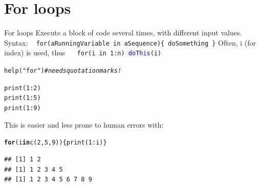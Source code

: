 \documentclass[xcolor=table,      handout ,    xcolor=dvipsnames]{beamer}\usepackage[]{graphicx}\usepackage[]{color}
\makeatletter
\newcommand{\hlnum}[1]{\textcolor[rgb]{0,0,0}{#1}}
\newcommand{\hlstr}[1]{\textcolor[rgb]{0.545,0.137,0.137}{#1}}
\newcommand{\hlcom}[1]{\textcolor[rgb]{0,0.392,0}{\textit{#1}}}
\newcommand{\hlopt}[1]{\textcolor[rgb]{0,0,0}{#1}}
\newcommand{\hlstd}[1]{\textcolor[rgb]{0,0,0}{#1}}
\newcommand{\hlkwa}[1]{\textcolor[rgb]{1,0,0}{\textbf{#1}}}
\newcommand{\hlkwd}[1]{\textcolor[rgb]{0,0,1}{#1}}
\newenvironment{kframe}{%
 \def\at@end@of@kframe{}%
 \ifinner\ifhmode%
  \def\at@end@of@kframe{\end{minipage}}%
  \begin{minipage}{\columnwidth}%
 \fi\fi%
 \def\FrameCommand##1{\hskip\@totalleftmargin \hskip-\fboxsep
 \colorbox{shadecolor}{##1}\hskip-\fboxsep
     \hskip-\linewidth \hskip-\@totalleftmargin \hskip\columnwidth}%
 \MakeFramed {\advance\hsize-\width
   \@totalleftmargin\z@ \linewidth\hsize
   \@setminipage}}%
 {\par\unskip\endMakeFramed%
 \at@end@of@kframe}
\newenvironment{knitrout}{}{} %
\newcommand{\rcode}[1]{\texttt{\textcolor{Blue}{#1}}}
\makeatother
\begin{document}
\fi %
\section{For loops}

\begin{frame}[fragile]{For loops}
Execute a block of code several times, with different input values.\\
Syntax: ~ \texttt{\alert{for}(aRunningVariable \alert{in} aSequence)\{ doSomething \}}
\pause
Often, i (for index) is used, thus ~~ \texttt{\alert{for}(i \alert{in} 1:n) \rcode{doThis}(i)}
\pause
\begin{knitrout}
\color{fgcolor}\begin{kframe}
\begin{alltt}
\hlkwd{help}\hlstd{(}\hlstr{"for"}\hlstd{)} \hlcom{# needs quotation marks!}
\end{alltt}
\end{kframe}
\end{knitrout}
\pause
\begin{knitrout}
\color{fgcolor}\begin{kframe}
\begin{alltt}
\hlkwd{print}\hlstd{(}\hlnum{1}\hlopt{:}\hlnum{2}\hlstd{)}
\hlkwd{print}\hlstd{(}\hlnum{1}\hlopt{:}\hlnum{5}\hlstd{)}
\hlkwd{print}\hlstd{(}\hlnum{1}\hlopt{:}\hlnum{9}\hlstd{)}
\end{alltt}
\end{kframe}
\end{knitrout}
\pause
This is easier and less prone to human errors with:
\pause
\begin{knitrout}
\color{fgcolor}\begin{kframe}
\begin{alltt}
\hlkwa{for}\hlstd{(i} \hlkwa{in} \hlkwd{c}\hlstd{(}\hlnum{2}\hlstd{,}\hlnum{5}\hlstd{,}\hlnum{9}\hlstd{) ) \{} \hlkwd{print}\hlstd{(}\hlnum{1}\hlopt{:}\hlstd{i) \}}
\end{alltt}
\begin{verbatim}
## [1] 1 2
## [1] 1 2 3 4 5
## [1] 1 2 3 4 5 6 7 8 9
\end{verbatim}
\end{kframe}
\end{knitrout}
\end{frame}
\end{document}
